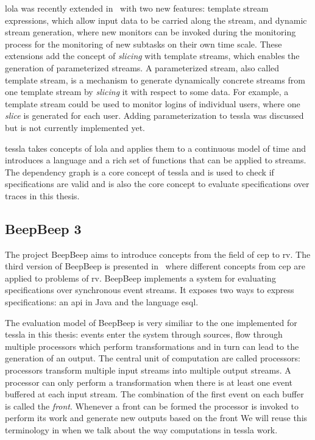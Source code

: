 \Gls{lola} was recently extended in~\cite{Faymonville2016} with two new features:  template stream expressions, which allow input data to be carried along the stream, and dynamic stream generation, where new monitors can be invoked during the monitoring process for the monitoring of new subtasks on their own time scale.
These extensions add the concept of \emph{slicing} with template streams, which enables the generation of  parameterized streams.
A parameterized stream, also called template stream, is a mechanism to generate dynamically concrete streams from one template stream by \emph{slicing} it with respect to some data.
For example, a template stream could be used to monitor logins of individual users, where one \emph{slice} is generated for each user.
Adding parameterization to \gls{tessla} was discussed but is not currently implemented yet.

\gls{tessla} takes concepts of \gls{lola} and applies them to a continuous model of time and introduces a language and a rich set of functions that can be applied to streams.
The dependency graph is a core concept of \gls{tessla} and is used to check if specifications are valid and is also the core concept to evaluate specifications over traces in this thesis.

\subsection{BeepBeep 3}
\label{sec:related:stream_based:beepbeep}

The project BeepBeep aims to introduce concepts from the field of \gls{cep} to \gls{rv}.
The third version of BeepBeep is presented in~\cite{Hall2011} where different concepts from \gls{cep} are applied to problems of \gls{rv}.
BeepBeep implements a system for evaluating specifications over synchronous event streams.
It exposes two ways to express specifications: an \gls{api} in Java and the language \gls{esql}.

The evaluation model of BeepBeep is very similiar to the one implemented for \gls{tessla} in this thesis: events enter the system through sources, flow through multiple processors which perform transformations and in turn can lead to the generation of an output.
The central unit of computation are called processors: processors transform multiple input streams into multiple output streams.
A processor can only perform a transformation when there is at least one event buffered at each input stream.
The combination of the first event on each buffer is called the \emph{front}.
Whenever a front can be formed the processor is invoked to perform its work and generate new outputs based on the front
We will reuse this terminology in  when we talk about the way computations in \gls{tessla} work.

